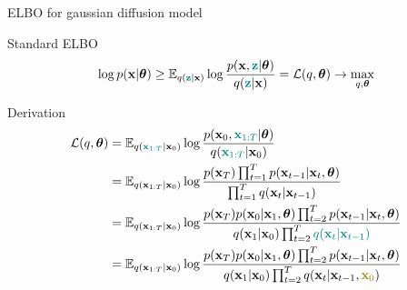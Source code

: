 \begin{frame}{ELBO for gaussian diffusion model}
	\begin{block}{Standard ELBO}
		\vspace{-0.4cm}
		\[
			\log p(\mathbf{x} | \boldsymbol{\theta}) \geq \mathbb{E}_{q({\color{teal}\mathbf{z}} | \mathbf{x})} \log \frac{p(\mathbf{x}, {\color{teal}\mathbf{z}} | \boldsymbol{\theta})}{q({\color{teal}\mathbf{z}} | \mathbf{x})} = \mathcal{L}(q, \boldsymbol{\theta}) \rightarrow \max_{q, \boldsymbol{\theta}}
		\]
		\vspace{-0.5cm}
	\end{block}
	\begin{block}{Derivation}
		\vspace{-0.5cm}
		{\small
		\begin{align*}
			\cL(q, \btheta) &= \bbE_{q({\color{teal}\bx_{1:T}} | \bx_0)} \log \frac{p(\bx_0, {\color{teal}\bx_{1:T}} | \btheta)}{q({\color{teal}\bx_{1:T}} | \bx_0)} \\
			& = \bbE_{q(\bx_{1:T} | \bx_0)} \log \frac{p(\bx_T) \prod_{t=1}^T p(\bx_{t-1} | \bx_t, \btheta) }{\prod_{t=1}^T q(\bx_t | \bx_{t-1})}  \\ 
			& = \bbE_{q(\bx_{1:T} | \bx_0)} \log \frac{p(\bx_T) p(\bx_0 | \bx_1, \btheta) \prod_{t=2}^T p(\bx_{t-1} | \bx_t, \btheta) }{q(\bx_1 | \bx_0)\prod_{t=2}^T {\color{teal}q(\bx_t | \bx_{t-1})}}  \\ 
			& = \bbE_{q(\bx_{1:T} | \bx_0)} \log \frac{p(\bx_T) p(\bx_0 | \bx_1, \btheta) \prod_{t=2}^T p(\bx_{t-1} | \bx_t, \btheta) }{q(\bx_1 | \bx_0)\prod_{t=2}^T q(\bx_t | \bx_{t-1}, {\color{olive}\bx_0})} 
		\end{align*}
		}
	\end{block}
	
\end{frame}

